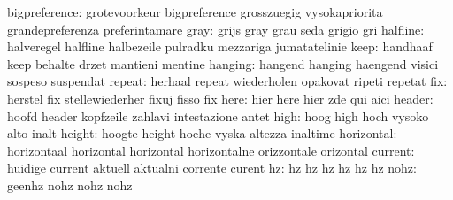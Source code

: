             bigpreference: grotevoorkeur             bigpreference
                           grosszuegig               vysokapriorita
                           grandepreferenza          preferintamare
                     gray: grijs                     gray
                           grau                      seda
                           grigio                    gri
                 halfline: halveregel                halfline
                           halbezeile                pulradku
                           mezzariga                 jumatatelinie
                     keep: handhaaf                  keep
                           behalte                   drzet
                           mantieni                  mentine
                  hanging: hangend                   hanging
                           haengend                  visici
                           sospeso                   suspendat
                   repeat: herhaal                   repeat
                           wiederholen               opakovat
                           ripeti                    repetat
                      fix: herstel                   fix
                           stellewiederher           fixuj
                           fisso                     fix
                     here: hier                      here
                           hier                      zde
                           qui                       aici
                   header: hoofd                     header
                           kopfzeile                 zahlavi
                           intestazione              antet
                     high: hoog                      high
                           hoch                      vysoko
                           alto                      inalt
                   height: hoogte                    height
                           hoehe                     vyska
                           altezza                   inaltime
               horizontal: horizontaal               horizontal
                           horizontal                horizontalne
                           orizzontale               orizontal
                  current: huidige                   current
                           aktuell                   aktualni
                           corrente                  curent
                       hz: hz                        hz
                           hz                        hz
                           hz                        hz
                     nohz: geenhz                    nohz
                           nohz                      nohz
